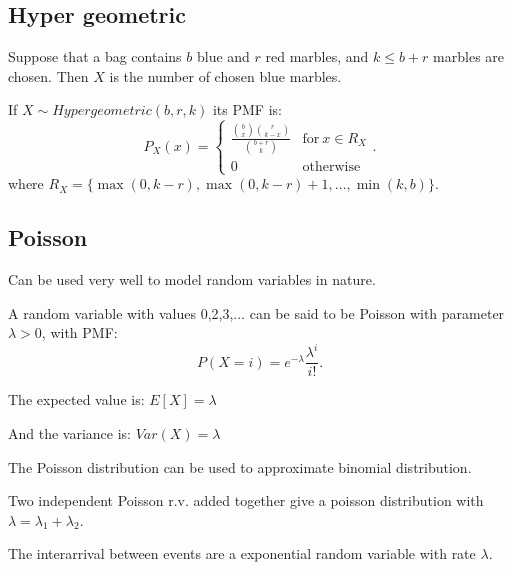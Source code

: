 \subsection{Hyper geometric}

Suppose that a bag contains $b$ blue and $r$ red marbles, and $k \leq b + r$ marbles are chosen.
Then $X$ is the number of chosen blue marbles.

\begin{definition}
    If $X \sim Hypergeometric(b,r,k)$ its PMF is: \[
        P_X(x) = \left\{
            \begin{array}{ll}
                \frac{\binom{b}{x} \binom{r}{k-x}}{\binom{b+r}{k}} & \mathrm{for} \: x \in R_X \\
                0 & \mathrm{otherwise}
            \end{array}
            \right.
    .\] 
    where $R_X = \{\max(0, k-r), \max(0,k-r)+1,...,\min(k,b)\}$.
\end{definition}

\subsection{Poisson}

Can be used very well to model random variables in nature.

\begin{definition}
    A random variable with values 0,2,3,... can be said to be Poisson with parameter $\lambda > 0$, with PMF: \[
        P(X = i) = e^{-\lambda} \frac{\lambda^i}{i!}
    .\] 
\end{definition}

The expected value is: $
    E[X] = \lambda
$ 

And the variance is: $
    Var(X) = \lambda
$ 

The Poisson distribution can be used to approximate binomial distribution.

\begin{lemma}
    Two independent Poisson r.v. added together give a poisson distribution with $\lambda = \lambda_1 + \lambda_2$.
\end{lemma}


\begin{lemma}
    The interarrival between events are a exponential random variable with rate $\lambda$.
\end{lemma}
